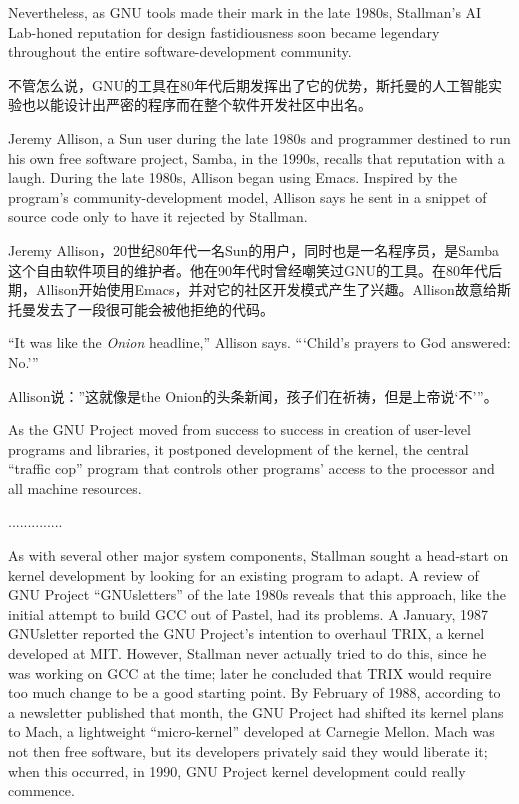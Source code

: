 \ifdefined\eng
Nevertheless, as GNU tools made their mark in the late 1980s, Stallman's AI Lab-honed reputation for design fastidiousness soon became legendary throughout the entire software-development community.
\fi

\ifdefined\chs
不管怎么说，GNU的工具在80年代后期发挥出了它的优势，斯托曼的人工智能实验也以能设计出严密的程序而在整个软件开发社区中出名。
\fi

\ifdefined\eng
Jeremy Allison, a Sun user during the late 1980s and programmer destined to run his own free software project, Samba, in the 1990s, recalls that reputation with a laugh. During the late 1980s, Allison began using Emacs. Inspired by the program's community-development model, Allison says he sent in a snippet of source code only to have it rejected by Stallman.
\fi

\ifdefined\chs
Jeremy Allison，20世纪80年代一名Sun的用户，同时也是一名程序员，是Samba这个自由软件项目的维护者。他在90年代时曾经嘲笑过GNU的工具。在80年代后期，Allison开始使用Emacs，并对它的社区开发模式产生了兴趣。Allison故意给斯托曼发去了一段很可能会被他拒绝的代码。
\fi

\ifdefined\eng
``It was like the \textit{Onion} headline,'' Allison says. ``\hspace{0.01in}`Child's prayers to God answered: No.'\hspace{0.01in}''
\fi

\ifdefined\chs
Allison说：”这就像是the Onion的头条新闻，孩子们在祈祷，但是上帝说‘不’”。
\fi

\ifdefined\eng
As the GNU Project moved from success to success in creation of user-level programs and libraries, it postponed development of the kernel, the central ``traffic cop'' program that controls other programs' access to the processor and all machine resources.
\fi

\ifdefined\chs
..............
\fi

\ifdefined\eng
As with several other major system components, Stallman sought a head-start on kernel development by looking for an existing program to adapt. A review of GNU Project ``GNUsletters'' of the late 1980s reveals that this approach, like the initial attempt to build GCC out of Pastel, had its problems. A January, 1987 GNUsletter reported the GNU Project's intention to overhaul TRIX, a kernel developed at MIT. However, Stallman never actually tried to do this, since he was working on GCC at the time; later he concluded that TRIX would require too much change to be a good starting point. By February of 1988, according to a newsletter published that month, the GNU Project had shifted its kernel plans to Mach, a lightweight ``micro-kernel'' developed at Carnegie Mellon. Mach was not then free software, but its developers privately said they would liberate it; when this occurred, in 1990, GNU Project kernel development could really commence.
\fi

